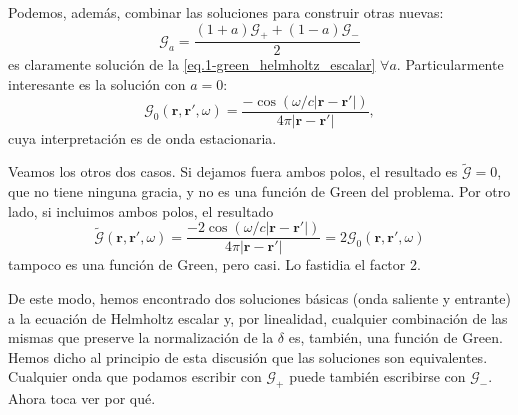 \begin{example}
    Podemos, además, combinar las soluciones para construir otras nuevas:
    \begin{equation}
        \mathcal{G}_a = \frac{(1+a)\mathcal{G}_+ + (1-a)\mathcal{G}_-}{2}
    \end{equation}
    es claramente solución de la \cref{eq.1-green_helmholtz_escalar} \(\forall a\). Particularmente interesante es la solución con \(a = 0\):   
    \begin{equation*}
        \mathcal{G}_0(\mathbf{r}, \mathbf{r}', \omega) = \frac{-\cos(\omega/c|\mathbf{r} - \mathbf{r}'|)}{4\pi |\mathbf{r} - \mathbf{r}'|},
    \end{equation*}
    cuya interpretación es de onda estacionaria.

    Veamos los otros dos casos. Si dejamos fuera ambos polos, el resultado es \(\tilde{\mathcal{G}} = 0\), que no tiene ninguna gracia, y no es una función de Green del problema. Por otro lado, si incluimos ambos polos, el resultado
    \begin{equation*}
        \tilde{\mathcal{G}}(\mathbf{r}, \mathbf{r}', \omega) = \frac{-2 \cos(\omega/c|\mathbf{r} - \mathbf{r}'|)}{4\pi |\mathbf{r} - \mathbf{r}'|} = 2\mathcal{G}_0(\mathbf{r}, \mathbf{r}', \omega)
    \end{equation*}
    tampoco es una función de Green, pero casi. Lo fastidia el factor 2.

    De este modo, hemos encontrado dos soluciones básicas (onda saliente y entrante) a la ecuación de Helmholtz escalar y, por linealidad, cualquier combinación de las mismas que preserve la normalización de la \(\delta\) es, también, una función de Green. Hemos dicho al principio de esta discusión que las soluciones son equivalentes. Cualquier onda que podamos escribir con \(\mathcal{G}_+\) puede también escribirse con \(\mathcal{G}_-\). Ahora toca ver por qué.


\end{example}
